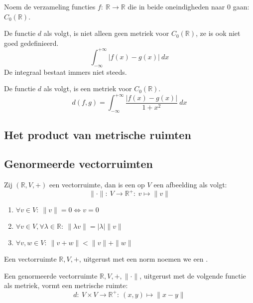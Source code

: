 \documentclass[main.tex]{subfiles}
\begin{document}
\begin{de}
  Noem de verzameling functies $f:\ \mathbb{R} \rightarrow \mathbb{R}$ die in beide oneindigheden naar $0$ gaan: $C_{0}(\mathbb{R})$.
\end{de}

\begin{vb}
  De functie $d$ als volgt, is niet alleen geen metriek voor $C_{0}(\mathbb{R})$, ze is ook niet goed gedefinieerd.
  \[ \int_{-\infty}^{+\infty}|f(x)-g(x)|\ dx \]
  De integraal bestaat immers niet steeds.
\end{vb}

\begin{vb}
  De functie $d$ als volgt, is een metriek voor $C_{0}(\mathbb{R})$.
  \[ d(f,g) = \int_{-\infty}^{+\infty}\frac{|f(x)-g(x)|}{1+x^{2}}\ dx \]
\end{vb}


\subsection{Het product van metrische ruimten}
\label{sec:het-product-van}


\subsection{Genormeerde vectorruimten}
\label{sec:genorm-vect}

\begin{de}
  Zij $(\mathbb{R},V,+)$ een vectorruimte, dan is een  op $V$ een afbeelding als volgt:
  \[ \|\cdot\|:\ V \rightarrow \mathbb{R}^{+}:\ v \mapsto \|v\| \]
  \begin{enumerate}
  \item $\forall v\in V:\ \|v\| = 0 \Leftrightarrow v=0$
  \item $\forall v\in V, \forall \lambda \in \mathbb{R}:\ \|\lambda v\| = |\lambda|\|v\|$
  \item $\forall v,w\in V:\ \|v+w\| < \|v\| + \|w\|$
  \end{enumerate}
\end{de}

\begin{de}
  Een vectorruimte $\mathbb{R},V,+$, uitgerust met een norm noemen we een .
\end{de}

\begin{st}
  Een genormeerde vectorruimte $\mathbb{R},V,+,\|\cdot\|$, uitgerust met de volgende functie als metriek, vormt een metrische ruimte:
  \[ d:\ V \times V \rightarrow \mathbb{R}^{+}:\ (x,y) \mapsto \|x-y\| \]
\end{st}
\end{document}
